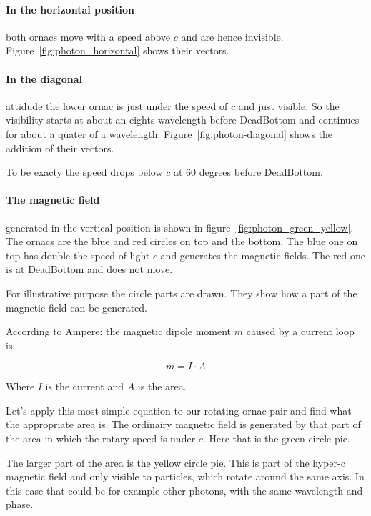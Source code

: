 \paragraph{
In the horizontal position} both ornacs move with a speed above $c$ and are hence invisible.
Figure~\vref{fig:photon_horizontal} shows their vectors.


\paragraph{
In the diagonal} attidude the lower ornac is just under the speed of $c$ and just visible. So the visibility starts at about an eights wavelength before DeadBottom and continues for about a quater of a wavelength. Figure~\vref{fig:photon-diagonal} shows the addition of  their vectors.

To be exacty the speed drops below $c$ at 60 degrees before DeadBottom.


\paragraph{
The magnetic field} generated in the vertical position is shown in 
figure~\vref{fig:photon_green_yellow}. The ornacs are the blue and red circles on top and the bottom. The blue one on top has double the speed of light $c$ and generates the magnetic fields. The red one is at DeadBottom and does not move. 

For illustrative purpose the circle parts are drawn. They show how a part of the magnetic field can be generated.




According to Ampere: the magnetic dipole moment $m$ caused by a current loop is:


\[ m=I\cdot A  \]

Where $I$ is the current and $A$ is the area.

Let's apply this most simple equation to our rotating ornac-pair and find what the appropriate area is.
The ordinairy magnetic field is generated by that part of the area in which the rotary speed is under $c$. 
Here that is the green circle pie.

The larger part of the area is the yellow circle pie.
This is part of the hyper-c magnetic field and 
only visible to particles, which rotate around the same axis.
In this case that could be for example other photons,
with the same wavelength and phase.


